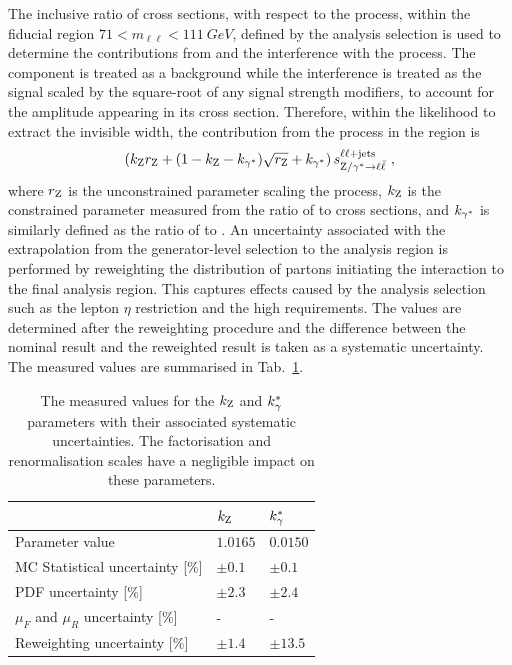%
The inclusive ratio of cross sections, with respect to the \IDYll process, within the fiducial region ${71<m_{\ell\ell}<\SI{111}{GeV}}$, defined by the analysis selection is used to determine the contributions from \Igstarll and the interference with the \IZll process. The \Igstarll component is treated as a background while the interference is treated as the \IZll signal scaled by the square-root of any signal strength modifiers, to account for the \IZll amplitude appearing in its cross section. Therefore, within the likelihood to extract the \PZ invisible width, the contribution from the \IDYll process in the \diellplusjets region is
%
\begin{equation}
    \left(k_{\mathrm{Z}}r_{\mathrm{Z}} + (1 - k_{\mathrm{Z}} - k_{\gamma^{*}})\sqrt{r_{\mathrm{Z}}} + k_{\gamma^{*}}\right)s_{{\mathrm{Z}/\gamma^{*}\rightarrow \ell\bar{\ell}}}^{\ell\ell+\mathrm{jets}}\ ,
\end{equation}
%
where $r_\mathrm{Z}$ is the unconstrained parameter scaling the \IZll process, $k_{\mathrm{Z}}$ is the constrained parameter measured from the ratio of \IZll to \IDYll cross sections, and $k_{\gamma^{*}}$ is similarly defined as the ratio of \Igstarll to \IDYll. An uncertainty associated with the extrapolation from the generator-level selection to the analysis region is performed by reweighting the distribution of partons initiating the interaction to the final analysis region. This captures effects caused by the analysis selection such as the lepton $\eta$ restriction and the high \recoil requirements. The values are determined after the reweighting procedure and the difference between the nominal result and the reweighted result is taken as a systematic uncertainty. The measured values are summarised in Tab.~\ref{tab:gstar-corrections}.

\begin{table}[htb]
    \centering
    \begin{tabular}{lll}
        \hline%
        & $k_\mathrm{Z}$ & $k_\gamma^{*}$ \\
        \hline
        Parameter value &  $1.0165$ & $0.0150$ \\
        MC Statistical uncertainty [\%] & $\pm 0.1$ & $\pm 0.1$ \\
        PDF uncertainty [\%] & $\pm 2.3$ & $\pm 2.4$ \\
        $\mu_F$ and $\mu_R$ uncertainty [\%] & - & - \\
        Reweighting uncertainty [\%] & $\pm 1.4$ & $\pm 13.5$ \\
        \hline%
    \end{tabular}
    \caption[Contributions to the \IDYll from the \IZll and \Igstarll processes.]{
        The measured values for the $k_\mathrm{Z}$ and $k_\gamma^{*}$ parameters with their associated systematic uncertainties. The factorisation and renormalisation scales have a negligible impact on these parameters.
    }
    \label{tab:gstar-corrections}
\end{table}


